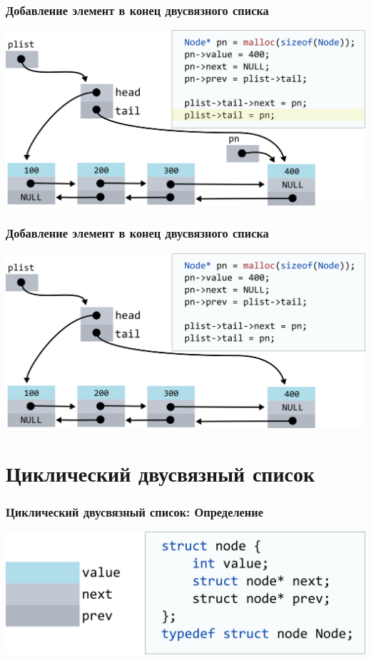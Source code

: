 \documentclass[10pt,pdf,hyperref={unicode}]{beamer}
\begin{document}
\begin{frame}[fragile]
\frametitle{Добавление элемент в конец двусвязного списка}
\begin{center}
\includegraphics[width=\imageSizeMult\linewidth]{../images/doublylist/doublylist_addlast7.png}
\end{center}
\end{frame}

\begin{frame}[fragile]
\frametitle{Добавление элемент в конец двусвязного списка}
\begin{center}
\includegraphics[width=\imageSizeMult\linewidth]{../images/doublylist/doublylist_addlast8.png}
\end{center}
\end{frame}

\section{Циклический двусвязный список}

\begin{frame}[fragile]
\frametitle{Циклический двусвязный список: Определение}
\begin{center}
\includegraphics[width=\imageSizeMult\linewidth]{../images/doublylist/circular_doublylist_definition.png}
\end{center}
\end{frame}
\end{document}
